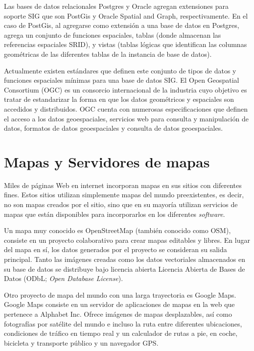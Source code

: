 Las bases de datos relacionales Postgres y Oracle agregan extensiones para soporte SIG que son PostGis y Oracle Spatial and Graph, respectivamente. En el caso de PostGis, al agregarse como extensión a una base de datos en Postgres, agrega un conjunto de funciones espaciales, tablas (donde almacenan las referencias espaciales SRID), y vistas (tablas lógicas que identifican las columnas geométricas de las diferentes tablas de la instancia de base de datos).

Actualmente existen estándares que definen este conjunto de tipos de datos y funciones espaciales mínimas para una base de datos SIG. El Open Geospatial Consortium (OGC) es un consorcio internacional de la industria cuyo objetivo es tratar de estandarizar la forma en que los datos geométricos y espaciales son accedidos y distribuidos. OGC cuenta con numerosas especificaciones que definen el acceso a los datos geoespaciales, servicios web para consulta y manipulación de datos, formatos de datos geoespaciales y consulta de datos geoespaciales.

\section{Mapas y Servidores de mapas}

Miles de páginas Web en internet incorporan mapas en sus sitios con diferentes fines. Estos sitios utilizan simplemente mapas del mundo preexistentes, es decir, no son mapas creados por el sitio, sino que en su mayoría utilizan servicios de mapas que están disponibles para incorporarlos en los diferentes \textit{software}.

Un mapa muy conocido es OpenStreetMap (también conocido como OSM), consiste en un proyecto colaborativo para crear mapas editables y libres. En lugar del mapa en sí, los datos generados por el proyecto se consideran su salida principal. Tanto las imágenes creadas como los datos vectoriales almacenados en su base de datos se distribuye bajo licencia abierta Licencia Abierta de Bases de Datos (ODbL; \textit{Open Database License}).

Otro proyecto de mapa del mundo con una larga trayectoria es Google Maps. Google Maps consiste en un servidor de aplicaciones de mapas en la web que pertenece a Alphabet Inc. Ofrece imágenes de mapas desplazables, así como fotografías por satélite del mundo e incluso la ruta entre diferentes ubicaciones, condiciones de tráfico en tiempo real y un calculador de rutas a pie, en coche, bicicleta y transporte público y un navegador GPS.

